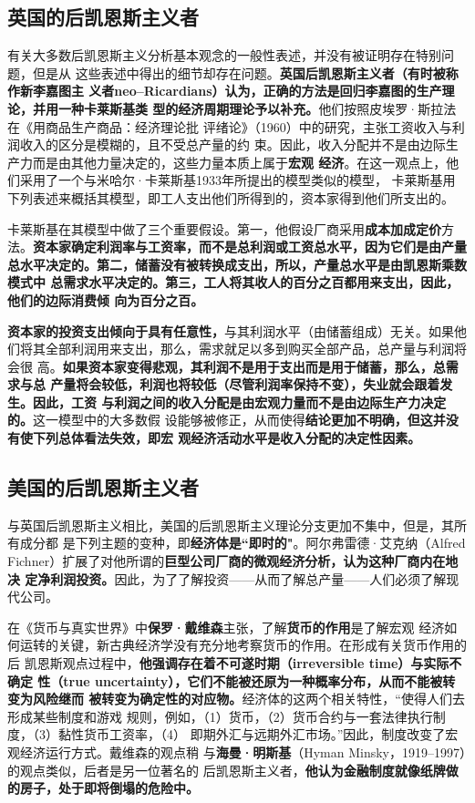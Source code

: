 \subsection{英国的后凯恩斯主义者}

有关大多数后凯恩斯主义分析基本观念的一般性表述，并没有被证明存在特别问题，但是从
这些表述中得出的细节却存在问题。\textbf{英国后凯恩斯主义者（有时被称作新李嘉图主
  义者neo--Ricardians）认为，正确的方法是回归李嘉图的生产理论，并用一种卡莱斯基类
  型的经济周期理论予以补充。}他们按照皮埃罗·斯拉法在《用商品生产商品：经济理论批
评绪论》（1960）中的研究，主张工资收入与利润收入的区分是模糊的，且不受总产量的约
束。因此，收入分配并不是由边际生产力而是由其他力量决定的，这些力量本质上属于\textbf{宏观
经济}。在这一观点上，他们采用了一个与米哈尔·卡莱斯基1933年所提出的模型类似的模型，
卡莱斯基用下列表述来概括其模型，即工人支出他们所得到的，资本家得到他们所支出的。

卡莱斯基在其模型中做了三个重要假设。第一，他假设厂商采用\textbf{成本加成定价}方
法。\textbf{资本家确定利润率与工资率，而不是总利润或工资总水平，因为它们是由产量
  总水平决定的。第二，储蓄没有被转换成支出，所以，产量总水平是由凯恩斯乘数模式中
总需求水平决定的。第三，工人将其收人的百分之百都用来支出，因此，他们的边际消费倾
向为百分之百。}

\textbf{资本家的投资支出倾向于具有任意性，}与其利润水平（由储蓄组成）无关。如果他
们将其全部利润用来支出，那么，需求就足以多到购买全部产品，总产量与利润将会很
高。\textbf{如果资本家变得悲观，其利润不是用于支出而是用于储蓄，那么，总需求与总
  产量将会较低，利润也将较低（尽管利润率保持不变），失业就会跟着发生。因此，工资
  与利润之间的收入分配是由宏观力量而不是由边际生产力决定的。}这一模型中的大多数假
设能够被修正，从而使得\textbf{结论更加不明确，但这并没有使下列总体看法失效，即宏
  观经济活动水平是收入分配的决定性因素。}
\clearpage
\subsection{美国的后凯恩斯主义者}

与英国后凯恩斯主义相比，美国的后凯恩斯主义理论分支更加不集中，但是，其所有成分都
是下列主题的变种，即\textbf{经济体是“即时的"}。阿尔弗雷德·艾克纳（Alfred
Fichner）扩展了对他所谓的\textbf{巨型公司厂商的微观经济分析，认为这种厂商内在地决
  定净利润投资。}因此，为了了解投资——从而了解总产量——人们必须了解现代公司。

在《货币与真实世界》中\textbf{保罗·戴维森}主张，了解\textbf{货币的作用}是了解宏观
经济如何运转的关键，新古典经济学没有充分地考察货币的作用。在形成有关货币作用的后
凯恩斯观点过程中，\textbf{他强调存在着不可遂时期（irreversible time）与实际不确定
  性（true uncertainty），它们不能被还原为一种概率分布，从而不能被转变为风险继而
  被转变为确定性的对应物。}经济体的这两个相关特性，“使得人们去形成某些制度和游戏
规则，例如，（1）货币，（2）货币合约与一套法律执行制度，（3）黏性货币工资率，（4）
即期外汇与远期外汇市场。”因此，制度改变了宏观经济运行方式。戴维森的观点稍
与\textbf{海曼·明斯基}（Hyman Minsky，1919--1997）的观点类似，后者是另一位著名的
后凯恩斯主义者，\textbf{他认为金融制度就像纸牌做的房子，处于即将倒塌的危险中。}

